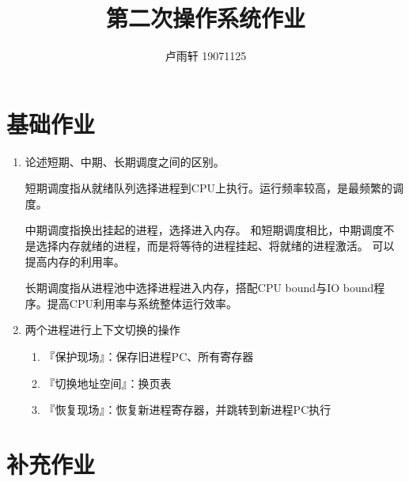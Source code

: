 \documentclass{ctexart}
\title{第二次操作系统作业}
\author{卢雨轩 19071125}
\begin{document}
\maketitle

\section*{基础作业}
\begin{enumerate}
\item 论述短期、中期、长期调度之间的区别。

短期调度指从就绪队列选择进程到CPU上执行。运行频率较高，是最频繁的调度。

中期调度指换出挂起的进程，选择进入内存。
和短期调度相比，中期调度不是选择内存就绪的进程，而是将等待的进程挂起、将就绪的进程激活。
可以提高内存的利用率。

长期调度指从进程池中选择进程进入内存，搭配CPU bound与IO bound程序。提高CPU利用率与系统整体运行效率。

\item 两个进程进行上下文切换的操作
    \begin{enumerate}
        \item 『保护现场』：保存旧进程PC、所有寄存器
        \item 『切换地址空间』：换页表
        \item 『恢复现场』：恢复新进程寄存器，并跳转到新进程PC执行
    \end{enumerate}
\end{enumerate}

\section*{补充作业}
\end{document}
